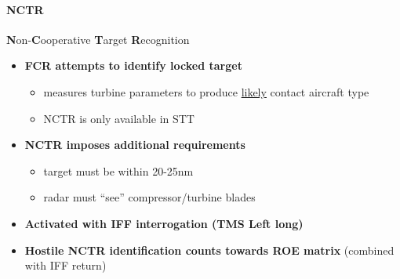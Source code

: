 \paragraph{NCTR}
\textbf{N}on-\textbf{C}ooperative \textbf{T}arget \textbf{R}ecognition
\begin{itemize}
    \item \textbf{FCR attempts to identify locked target}
    \begin{itemize}
        \item measures turbine parameters to produce \underline{likely} contact aircraft type
        \item NCTR is only available in STT
    \end{itemize}
    \item \textbf{NCTR imposes additional requirements}
    \begin{itemize}
        \item target must be within 20-25nm
        \item radar must ``see'' compressor/turbine blades
    \end{itemize}
    \item \textbf{Activated with IFF interrogation (TMS Left long)}
    \item \textbf{Hostile NCTR identification counts towards ROE matrix} (combined with IFF return)
\end{itemize}

